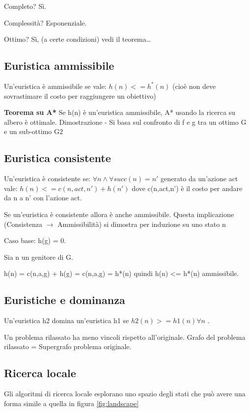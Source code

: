 Completo? Sì.

Complessità? Esponenziale.

Ottimo? Sì, (a certe condizioni) vedi il teorema\dots

\subsection{Euristica ammissibile}

Un'euristica è ammissibile se vale: $h(n) <= h^*(n)$
(cioè non deve sovrastimare il costo per raggiungere un obiettivo)

\textbf{Teorema su A*}
Se h(n) è un'euristica ammissibile,  A* usando la ricerca su albero è ottimale.
Dimostrazione - Si basa sul confronto di f e g tra un ottimo G e un sub-ottimo G2

\subsection{Euristica consistente}

Un'euristica è consistente se:
$\forall n \land \forall succ(n) = n'$ generato da un'azione act vale:
$h(n) <= c(n,act,n') + h(n')$
dove c(n,act,n') è il costo per andare da n a n' con l'azione act.

Se un'euristica è consistente allora è anche ammissibile.
Questa implicazione (Consistenza $\rightarrow$ Ammissibilità) si dimostra per
induzione su uno stato n

Caso base:
h(g) = 0.

Sia n un genitore di G.

h(n) = c(n,a,g) + h(g) = c(n,a,g) = h*(n) quindi h(n) <= h*(n) ammissibile.

\subsection{Euristiche e dominanza}

Un'euristica h2 domina un'euristica h1 se $h2(n) >= h1(n) \forall n$ .

Un problema rilassato ha meno vincoli rispetto all'originale.
Grafo del problema rilassato = Supergrafo problema originale.

\subsection{Ricerca locale}

Gli algoritmi di ricerca locale esplorano uno spazio degli stati che può avere
una forma simile a quella in figura \ref{fig:landscape}

